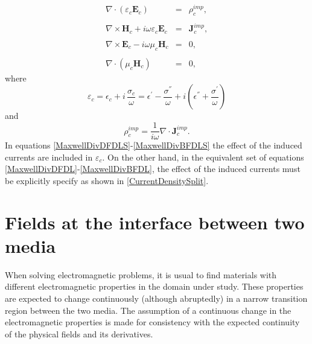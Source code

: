 \begin{eqnarray}
    \nabla\cdot\left(\varepsilon_{c}\mathbf{E}_{c}\right) &=& \rho_{c}^{imp}, \label{MaxwellDivDFDLS}
	\\\nonumber
	\\[-1em]
	\nabla\times\mathbf{H}_{c} + i\omega\varepsilon_{c}\mathbf{E}_{c} &=& \mathbf{J}_{c}^{imp}, \label{MaxwellRotHFDLS}
	\\\nonumber
	\\[-1em]
	\nabla\times\mathbf{E}_{c} - i\omega\mu_{c}\mathbf{H}_{c} &=& 0, \label{MaxwellRotEFDLS}
	\\\nonumber
	\\[-1em]
	\nabla\cdot\left(\mu_{c}\mathbf{H}_{c}\right) &=& 0, \label{MaxwellDivBFDLS}
\end{eqnarray}
where
\begin{equation}\label{VarEpsilonDef}
    \varepsilon_{c} = \epsilon_{c} + i\, \frac{\sigma_{c}}{\omega} = \epsilon^{'} - \frac{\sigma^{''}}{\omega} + i\left(\epsilon^{''} + \frac{\sigma^{'}}{\omega}\right)
\end{equation}
and
\begin{equation}\label{ChargeDensityNC}
    \rho_{c}^{imp} = \frac{1}{i\omega}\nabla\cdot\mathbf{J}_{c}^{imp}.
\end{equation}
In equations \eqref{MaxwellDivDFDLS}-\eqref{MaxwellDivBFDLS} the effect of the induced currents are included in $\varepsilon_{c}$. On the other hand, in the equivalent set of equations \eqref{MaxwellDivDFDL}-\eqref{MaxwellDivBFDL}, the effect of the induced currents must be explicitly specify as shown in \eqref{CurrentDensitySplit}.

\section{Fields at the interface between two media}\label{sEMInterface}

When solving electromagnetic problems, it is usual to find materials with different electromagnetic properties in the domain under study. These properties are expected to change continuously (although abruptedly) in a narrow transition region between the two media. The assumption of a continuous change in the electromagnetic properties is made for consistency with the expected continuity of the physical fields and its derivatives. 

